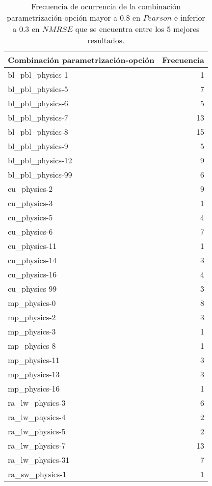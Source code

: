 \begin{itemize}
\begin{table}[H]
\caption{Frecuencia de ocurrencia de la combinación parametrización-opción mayor a 0.8 en $Pearson$ e inferior a 0.3 en $NMRSE$ que se encuentra entre los 5 mejores resultados.}
\centering
\label{tabla_mejores_param_opciones}
\begin{tabular}{lr}
\toprule
Combinación parametrización-opción               & Frecuencia       \\
\midrule
bl\_pbl\_physics-1     &      1 \\
bl\_pbl\_physics-5     &      7 \\
bl\_pbl\_physics-6     &      5 \\
bl\_pbl\_physics-7     &     13 \\
bl\_pbl\_physics-8     &     15 \\
bl\_pbl\_physics-9     &      5 \\
bl\_pbl\_physics-12    &      9 \\
bl\_pbl\_physics-99    &      6 \\ \hline
cu\_physics-2         &      9 \\
cu\_physics-3         &      1 \\
cu\_physics-5         &      4 \\
cu\_physics-6         &      7 \\
cu\_physics-11        &      1 \\
cu\_physics-14        &      3 \\
cu\_physics-16        &      4 \\
cu\_physics-99        &      3 \\ \hline
mp\_physics-0         &      8 \\
mp\_physics-2         &      3 \\
mp\_physics-3         &      1 \\
mp\_physics-8         &      1 \\
mp\_physics-11        &      3 \\
mp\_physics-13        &      3 \\
mp\_physics-16        &      1 \\ \hline
ra\_lw\_physics-3      &      6 \\
ra\_lw\_physics-4      &      2 \\
ra\_lw\_physics-5      &      2 \\
ra\_lw\_physics-7      &     13 \\
ra\_lw\_physics-31     &      7 \\ \hline
ra\_sw\_physics-1      &      1 \\

\end{tabular}
\end{table}
\end{itemize}
